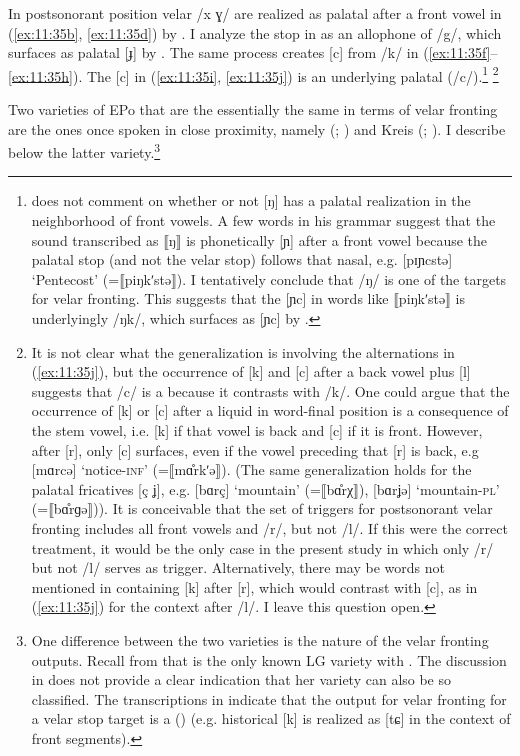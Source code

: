 In postsonorant position velar /x ɣ/ are realized as palatal after a front vowel in (\ref{ex:11:35b}, \ref{ex:11:35d}) by . I analyze the stop in  as an allophone of /g/, which surfaces as palatal [ɟ] by . The same process creates [c] from /k/ in (\ref{ex:11:35f}--\ref{ex:11:35h}). The [c] in (\ref{ex:11:35i}, \ref{ex:11:35j}) is an underlying palatal (/c/).\footnote{{\citet{Pirk1928} does not comment on whether or not [ŋ] has a palatal realization in the neighborhood of front vowels. A few words in his grammar suggest that the sound transcribed as ⟦ŋ⟧ is phonetically [ɲ] after a front vowel because the palatal stop (and not the velar stop) follows that nasal, e.g. [pɪɲcstə]  ‘Pentecost’ (=⟦piŋkʹstə⟧). I tentatively conclude that /ŋ/ is one of the targets for velar fronting. This suggests that the [ɲc] in words like ⟦piŋkʹstə⟧ is underlyingly /ŋk/, which surfaces as [ɲc] by .}} \footnote{{It is not clear what the generalization is involving the alternations in (\ref{ex:11:35j}), but the occurrence of [k] and [c] after a back vowel plus [l] suggests that /c/ is a  because it contrasts with /k/. One could argue that the occurrence of [k] or [c] after a liquid in word-final position is a consequence of the stem vowel, i.e. [k] if that vowel is back and [c] if it is front.  However, after [r], only [c] surfaces, even if the vowel preceding that [r] is back, e.g [mɑrcə] ‘notice{}-}\textrm{\textsc{inf}}\textrm{’ (=⟦mɑ̊rkʹə⟧). (The same generalization holds for the palatal fricatives [ç ʝ], e.g. [bɑrç] ‘mountain’ (=⟦bɑ̊rχ⟧), [bɑrʝə] ‘mountain-\textsc{pl}’ (=⟦bɑ̊rɡə⟧)). It is conceivable that the set of triggers for postsonorant velar fronting includes all front vowels and /r/, but not /l/. If this were the correct treatment, it would be the only case in the present study in which only /r/ but not /l/ serves as trigger. Alternatively, there may be words not mentioned in \citet{Pirk1928} containing [k] after [r], which would contrast with [c], as in (\ref{ex:11:35j}) for the context after /l/. I leave this question open.}}

Two varieties of EPo that are the essentially the same in terms of velar fronting are the ones once spoken in close proximity, namely  (\citealt{Darski1973}; ) and Kreis  (\citealt{Semrau1915a,Semrau1915b}; ). I describe below the latter variety.\footnote{\label{fn:11:15}One difference between the two varieties is the nature of the velar fronting outputs. Recall from  that  is the only known LG variety with . The discussion in \citet{Semrau1915a,Semrau1915b} does not provide a clear indication that her variety can also be so classified. The transcriptions in \citet{Darski1973} indicate that the output for velar fronting for a velar stop target is a ()  (e.g. historical [k] is realized as [tɕ] in the context of front segments).}

